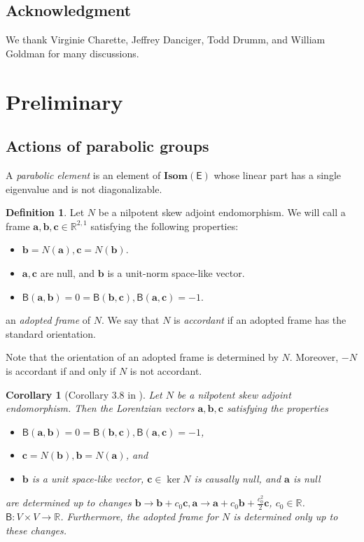\documentclass{amsart}
\numberwithin{equation}{section}
\newcommand\bR{{\mathbb{R}}}
\newcommand\ra{\rightarrow}
\newcommand\Isom{{\mathbf{Isom}}}
\newcommand\Lspace{\mathsf E}
\newcommand\Bs{{\mathsf{B}}}
\newcommand{\va}{\mathbf{a}}
\newcommand{\vb}{\mathbf{b}}
\newcommand{\vc}{\mathbf{c}}
\newtheorem{corollary}[theorem]{Corollary}
\theoremstyle{definition}
\newtheorem{definition}{Definition}[section]
\theoremstyle{remark}
\begin{document}



\subsection{Acknowledgment} 
We thank Virginie Charette, Jeffrey Danciger, Todd Drumm, and William Goldman
for many discussions. 



\section{Preliminary} \label{sec:preliminary} 



\subsection{Actions of parabolic groups} \label{sub:action}

A {\em parabolic element} is an element of $\Isom(\Lspace)$ whose linear
part has a single eigenvalue and is not diagonalizable. 

\begin{definition} 
	Let $N$ be a nilpotent skew adjoint endomorphism. 
	We will call a frame $\va, \vb, \vc \in \bR^{2, 1}$ satisfying the following properties: 
	\begin{itemize} 
		\item $\vb = N(\va), \vc = N(\vb)$.
		\item $\va, \vc$ are null, and $\vb$ is a unit-norm space-like vector.  
		\item $\Bs(\va, \vb)=0=\Bs(\vb, \vc), \Bs(\va, \vc) = -1$. 
	\end{itemize}
	an {\em adopted frame} of $N$.  %
	We say that $N$ is {\em accordant} if an adopted frame has the standard orientation. 
\end{definition}
Note that the orientation of an adopted frame is determined by $N$. Moreover, $-N$ is accordant if and only if $N$ is not accordant.

\begin{corollary}[Corollary 3.8 in \cite{CDG22}] \label{cor:parac}
	Let $N$ be a nilpotent skew adjoint endomorphism. Then
the Lorentzian vectors $\va, \vb, \vc$ 
 satisfying the properties 
\begin{itemize} 
\item  $\Bs(\va, \vb)=0=\Bs(\vb, \vc), \Bs(\va, \vc) = -1$, 
\item $ \vc = N(\vb), \vb = N(\va)$, and 
\item $\vb$ is a unit space-like vector, $\vc \in \ker N$ is causally null,  and $\va$ is null
\end{itemize}
are determined up to changes 
$\vb \ra \vb + c_0 \vc, \va \ra \va + c_0 \vb + \frac{c_0^2}{2} \vc$, $c_0\in \bR$.
$\Bs: V \times V \ra \bR$.  
Furthermore, the adopted frame for $N$ is determined only up to these changes. 
\end{corollary} 
\end{document}
